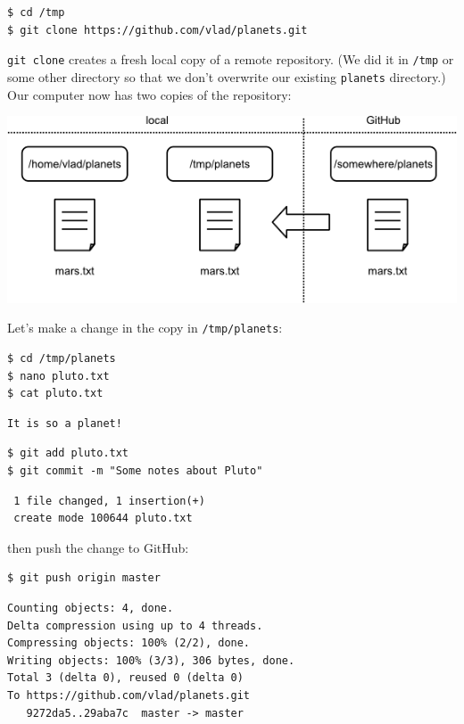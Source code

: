 \documentclass{book}
\begin{document}
\begin{verbatim}
$ cd /tmp
$ git clone https://github.com/vlad/planets.git
\end{verbatim}

\texttt{git clone} creates a fresh local copy of a remote repository.
(We did it in \texttt{/tmp} or some other directory so that we don't
overwrite our existing \texttt{planets} directory.) Our computer now has
two copies of the repository:

\includegraphics{novice/git/img/git-after-duplicate-clone.png}

Let's make a change in the copy in \texttt{/tmp/planets}:

\begin{verbatim}
$ cd /tmp/planets
$ nano pluto.txt
$ cat pluto.txt
\end{verbatim}

\begin{verbatim}
It is so a planet!
\end{verbatim}

\begin{verbatim}
$ git add pluto.txt
$ git commit -m "Some notes about Pluto"
\end{verbatim}

\begin{verbatim}
 1 file changed, 1 insertion(+)
 create mode 100644 pluto.txt
\end{verbatim}

then push the change to GitHub:

\begin{verbatim}
$ git push origin master
\end{verbatim}

\begin{verbatim}
Counting objects: 4, done.
Delta compression using up to 4 threads.
Compressing objects: 100% (2/2), done.
Writing objects: 100% (3/3), 306 bytes, done.
Total 3 (delta 0), reused 0 (delta 0)
To https://github.com/vlad/planets.git
   9272da5..29aba7c  master -> master
\end{verbatim}
\end{document}
